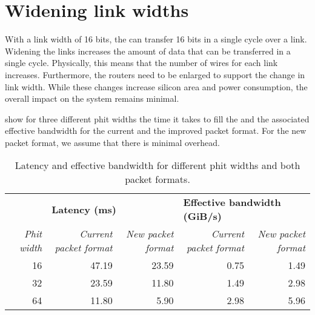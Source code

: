 \section{Widening link widths}
With a link width of 16 bits, the \confignoc{} can transfer 16 bits in a single cycle over a link.
Widening the links increases the amount of data that can be transferred in a single cycle.
Physically, this means that the number of wires for each link increases.
Furthermore, the routers need to be enlarged to support the change in link width.
While these changes increase silicon area and power consumption, the overall impact on the system remains minimal.

 show for three different phit widths the time it takes to fill the \graicore{} and the associated effective bandwidth for the current and the improved packet format.
For the new packet format, we assume that there is minimal overhead.

\begin{table}[hbtp]
\centering
\begin{adjustbox}{width=\linewidth}
\begin{tabular}{@{}rrrrr@{}}
\toprule
                    & \multicolumn{2}{l}{\textbf{Latency (ms)}} & \multicolumn{2}{l}{\textbf{Effective bandwidth (GiB/s)}} \\ \cmidrule(lr){2-3} \cmidrule(lr){4-5}
\textit{Phit width} & \textit{Current packet format}    & \textit{New packet format}   & \textit{Current packet format}    & \textit{New packet format}   \\ \midrule
16                  & 47.19                    & 23.59               & 0.75                     & 1.49                \\
32                  & 23.59                    & 11.80               & 1.49                     & 2.98                \\
64                  & 11.80                    & 5.90                & 2.98                     & 5.96                \\ \bottomrule
\end{tabular}
\end{adjustbox}
\caption{Latency and effective bandwidth for different phit widths and both packet formats.}
\label{tab:latency_bandwidth_phit_width_packet_format}
\end{table}

